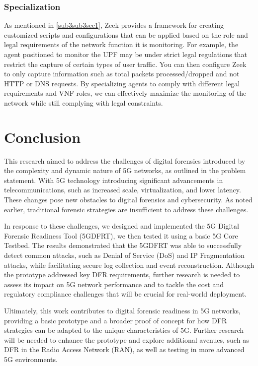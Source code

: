\documentclass[final,1p,times,authoryear]{elsarticle}
\begin{document}
\subsubsection{Specialization}
\label{sub5sub5sec2}
As mentioned in \ref{sub3sub3sec1}, Zeek provides a framework for creating customized scripts and configurations that can be applied based on the role and legal requirements of the network function it is monitoring. For example, the agent positioned to monitor the UPF may be under strict legal regulations that restrict the capture of certain types of user traffic. You can then configure Zeek to only capture information such as total packets processed/dropped and not HTTP or DNS requests. By specializing agents to comply with different legal requirements and VNF roles, we can effectively maximize the monitoring of the network while still complying with legal constraints.

\newpage
\section{Conclusion}
\label{sec6}
This research aimed to address the challenges of digital forensics introduced by the complexity and dynamic nature of 5G networks, as outlined in the problem statement. With 5G technology introducing significant advancements in telecommunications, such as increased scale, virtualization, and lower latency. These changes pose new obstacles to digital forensics and cybersecurity. As noted earlier, traditional forensic strategies are insufficient to address these challenges.

\vspace{1em}

In response to these challenges, we designed and implemented the 5G Digital Forensic Readiness Tool (5GDFRT), we then tested it using a basic 5G Core Testbed. The results demonstrated that the 5GDFRT was able to successfully detect common attacks, such as Denial of Service (DoS) and IP Fragmentation attacks, while facilitating secure log collection and event reconstruction. Although the prototype addressed key DFR requirements, further research is needed to assess its impact on 5G network performance and to tackle the cost and regulatory compliance challenges that will be crucial for real-world deployment.

\vspace{1em}

Ultimately, this work contributes to digital forensic readiness in 5G networks, providing a basic prototype and a broader proof of concept for how DFR strategies can be adapted to the unique characteristics of 5G. Further research will be needed to enhance the prototype and explore additional avenues, such as DFR in the Radio Access Network (RAN), as well as testing in more advanced 5G environments.

\newpage


\end{document}

